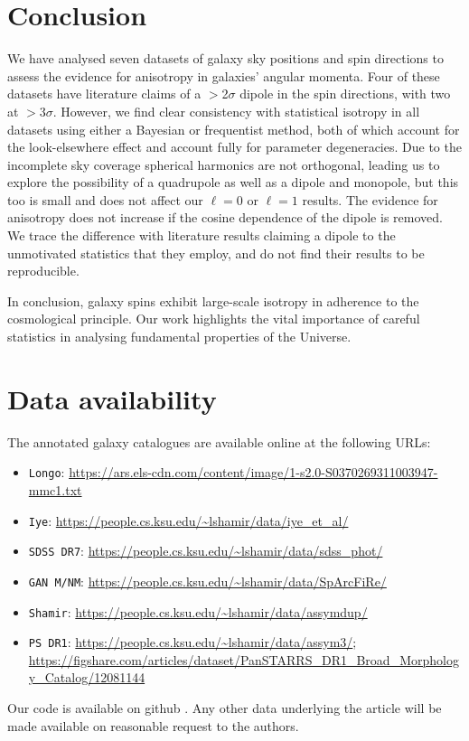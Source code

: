 \documentclass[fleqn,usenatbib,nofootinbib]{mnras}
\newcommand{\github}[1]{\href{#1}{\faGithubSquare}}
\newcommand{\githublink}{\github{https://github.com/harrydesmond/GalaxySpinAnisotropy}}
\begin{document}
\section{Conclusion}
\label{sec:conc}

We have analysed seven datasets of galaxy sky positions and spin directions to assess the evidence for anisotropy in galaxies' angular momenta. Four of these datasets have literature claims of a $>$2$\sigma$ dipole in the spin directions, with two at $>$3$\sigma$. However, we find clear consistency with statistical isotropy in all datasets using either a Bayesian or frequentist method, both of which account for the look-elsewhere effect and account fully for parameter degeneracies. Due to the incomplete sky coverage spherical harmonics are not orthogonal, leading us to explore the possibility of a quadrupole as well as a dipole and monopole, but this too is small and does not affect our $\ell=0$ or $\ell=1$ results. The evidence for anisotropy does not increase if the cosine dependence of the dipole is removed. We trace the difference with literature results claiming a dipole to the unmotivated statistics that they employ, and do not find their results to be reproducible.

In conclusion, galaxy spins exhibit large-scale isotropy in adherence to the cosmological principle. Our work highlights the vital importance of careful statistics in analysing fundamental properties of the Universe.



\section*{Data availability}

The annotated galaxy catalogues are available online at the following URLs:
\begin{itemize}
\item \texttt{Longo}: \url{https://ars.els-cdn.com/content/image/1-s2.0-S0370269311003947-mmc1.txt}
\item \texttt{Iye}: \url{https://people.cs.ksu.edu/~lshamir/data/iye_et_al/}
\item \texttt{SDSS DR7}: \url{https://people.cs.ksu.edu/~lshamir/data/sdss_phot/}
\item \texttt{GAN M/NM}: \url{https://people.cs.ksu.edu/~lshamir/data/SpArcFiRe/}
\item \texttt{Shamir}: \url{https://people.cs.ksu.edu/~lshamir/data/assymdup/}
\item \texttt{PS DR1}: \url{https://people.cs.ksu.edu/~lshamir/data/assym3/}; \url{https://figshare.com/articles/dataset/PanSTARRS_DR1_Broad_Morphology_Catalog/12081144}
\end{itemize}
Our code is available on github \githublink. Any other data underlying the article will be made available on reasonable request to the authors.
\end{document}
